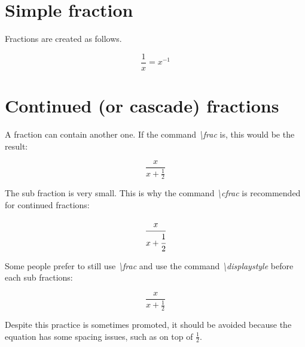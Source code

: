 \documentclass{article}
\begin{document}
\section*{Simple fraction}

Fractions are created as follows.


\[\frac{1}{x} = x^{-1}\]

\section*{Continued (or cascade) fractions}

A fraction can contain another one. If the command \emph{\textbackslash frac} is, this would be the result:

\[\frac{x}{x + \frac{1}{2}}\]

The sub fraction is very small. This is why the command \emph{\textbackslash cfrac} is recommended for continued fractions:

\[\cfrac{x}{x + \cfrac{1}{2}}\]

Some people prefer to still use \emph{\textbackslash frac} and use the command \emph{\textbackslash displaystyle} before each sub fractions:

\[\frac{x}{x + \displaystyle\frac{1}{2}}\]

Despite this practice is sometimes promoted, it should be avoided because the equation has some spacing issues, such as on top of $\frac{1}{2}$.
\end{document}
